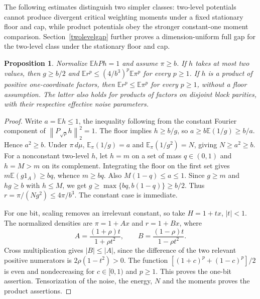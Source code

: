 \documentclass[11pt]{article}
\newcommand{\E}{\mathbb E}
\newcommand{\norm}[1]{\left\|#1\right\|}
\newtheorem{proposition}[theorem]{Proposition}
\begin{document}
The following estimates distinguish two simpler classes: two-level potentials cannot produce divergent critical weighting moments under a fixed stationary floor and cap, while product potentials obey the stronger constant-one moment comparison. Section~\ref{twolevelgap} further proves a dimension-uniform full gap for the two-level class under the stationary floor and cap.
\begin{proposition}\label{simplefamilies}
Normalize $\E hPh=1$ and assume $\pi\geq b$. If $h$ takes at most two values, then $g\geq b/2$ and
$\E r^p\leq(4/b^3)^p\E\pi^p$ for every $p\geq1$.
If $h$ is a product of positive one-coordinate factors, then $\E r^p\leq\E\pi^p$ for every $p\geq1$, without a floor assumption. The latter also holds for products of factors on disjoint block parities, with their respective effective noise parameters.
\end{proposition}
\begin{proof}
Write $a=\E h\leq1$, the inequality following from the constant Fourier component of $\norm{P_{\sqrt\rho}h}_2^2=1$. The floor implies $h\geq b/g$, so $a\geq b\E(1/g)\geq b/a$. Hence $a^2\geq b$. Under $\pi\,d\mu$,
$\E_\pi(1/g)=a$ and $\E_\pi(1/g^2)=N$, giving $N\geq a^2\geq b$.
For a nonconstant two-level $h$, let $h=m$ on a set of mass $q\in(0,1)$ and $h=M>m$ on its complement. Integrating the floor on the first set gives $m\E(g1_A)\geq bq$, whence $m\geq bq$. Also $M(1-q)\leq a\leq1$. Since $g\geq m$ and $hg\geq b$ with $h\leq M$, we get $g\geq\max\{bq,b(1-q)\}\geq b/2$. Thus $r=\pi/(Ng^2)\leq4\pi/b^3$. The constant case is immediate.

For one bit, scaling removes an irrelevant constant, so take $H=1+tx$, $|t|<1$. The normalized densities are $\pi=1+Ax$ and $r=1+Bx$, where
\[
 A=\frac{(1+\rho)t}{1+\rho t^2},\qquad
 B=\frac{(1-\rho)t}{1-\rho t^2}.
\]
Cross multiplication gives $|B|\leq|A|$, since the difference of the two relevant positive numerators is $2\rho(1-t^2)>0$. The function
$[(1+c)^p+(1-c)^p]/2$ is even and nondecreasing for $c\in[0,1)$ and $p\geq1$. This proves the one-bit assertion. Tensorization of the noise, the energy, $N$ and the moments proves the product assertions.
\end{proof}
\end{document}
